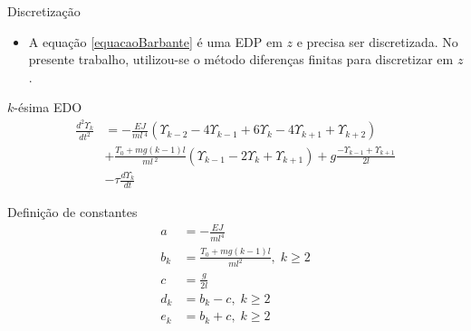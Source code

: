\documentclass[10pt]{beamer}
\begin{document}
\begin{frame}[fragile]{Discretização}

\begin{block}{}
\begin{itemize}
	\item A equação \ref{equacaoBarbante} é uma EDP em $z$ e precisa ser discretizada. No presente trabalho, utilizou-se o método diferenças finitas para discretizar em $z$.
\end{itemize}
\end{block}

\begin{block}{$k$-ésima EDO}
\begin{align}
	\frac{d^2\Upsilon_k}{dt^2} &= -\frac{EJ}{m l\,^4}\left(\Upsilon_{k-2} - 4\Upsilon_{k-1}+6\Upsilon_{k}-4\Upsilon_{k+1}+\Upsilon_{k+2}\right)\nonumber\\
	&+ \frac{T_0+mg(k-1)l}{m l\,^2}\left(\Upsilon_{k-1}-2\Upsilon_{k} + \Upsilon_{k+1}\right)+g\frac{-\Upsilon_{k-1}+\Upsilon_{k+1}}{2l}\nonumber\\
	&-\tau\frac{d\Upsilon_k}{dt}
\end{align}
\end{block}
\end{frame}

\begin{frame}[fragile]{Definição de constantes}
\begin{align}
	a &= -\frac{EJ}{m l^4}\\
	b_k &= \frac{T_0 + mg(k-1)l}{m l^2},\; k\ge 2\\
	c &= \frac{g}{2l}\\
	d_k &= b_k - c,\; k\ge 2\\
	e_k &= b_k + c,\; k\ge 2
\end{align}	
\end{frame}
\end{document}
